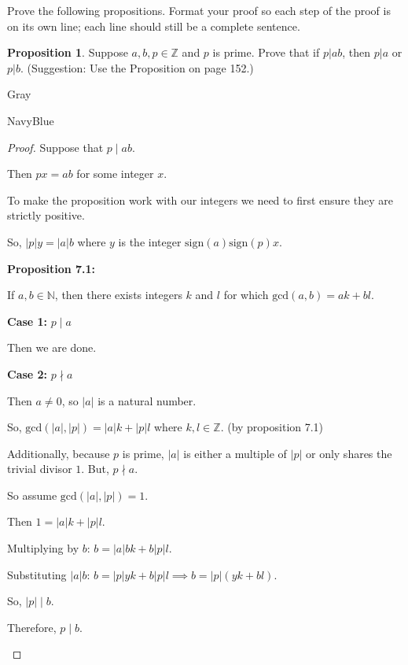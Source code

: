 \documentclass[12pt]{amsart}
\theoremstyle{named}
\newenvironment{prf}
{\medskip\begin{color}{Gray}\begin{framed}\begin{color}{NavyBlue}\begin{proof}[Proof]
\doublespacing}
{\end{proof}\end{color}\end{framed}\end{color}\medskip}
\theoremstyle{definition}
\newtheorem{proposition}{Proposition}
\newcommand{\Z}{\mathbb Z}
\begin{document}
Prove the following propositions. Format your proof so each step of the proof is on its own line; each line should still be a complete sentence.

\begin{proposition}
	Suppose $a,b,p\in\Z$ and $p$ is prime.
	Prove that if $p|ab$, then $p|a$ or $p|b$.
	(Suggestion: Use the Proposition on page 152.)
\end{proposition}

\begin{prf}
	\phantom{ }

	Suppose that $p\mid ab$. 
	
	Then $px = ab$ for some integer $x$.

	To make the proposition work with our integers we need to first
	ensure they are strictly positive. 
	
	So, $|p|y = |a|b$ where $y$ is the integer $\text{sign}(a)\text{sign}(p)x$.

	\textbf{Proposition 7.1:} 
	\begin{adjustwidth}{2em}{0em}
		If $a,b \in \mathbb N$, then
		there exists integers $k$ and $l$ for which $\text{gcd}(
		a,b) = ak + bl$.
	\end{adjustwidth} 

	\textbf{Case 1: } $p \mid a$
	\begin{adjustwidth}{2em}{0em}
		Then we are done. 
	\end{adjustwidth}

	\textbf{Case 2: } $p \nmid a$
	\begin{adjustwidth}{2em}{0em}
		Then $a \neq 0$, so $|a|$ is a natural number. 

		So, $\text{gcd}(|a|,|p|) = |a|k + |p|l$ where $k,l \in \mathbb Z$.
		(by proposition 7.1)

		Additionally, because $p$ is prime, $|a|$ is either a
		multiple of $|p|$ or only shares the trivial divisor $1$.
		But, $p \nmid a$.
	
		So assume $\text{gcd}(|a|,|p|) = 1$.
	
		Then $1 = |a|k + |p|l$.
	
		Multiplying by $b$: $b = |a|bk + b|p|l$.
	
		Substituting $|a|b$: $b = |p|yk + b|p|l \implies b = |p|(yk+bl)$.
	
		So, $|p| \mid b$.

		Therefore, $p \mid b$. 
	\end{adjustwidth}
\end{prf}
\end{document}
